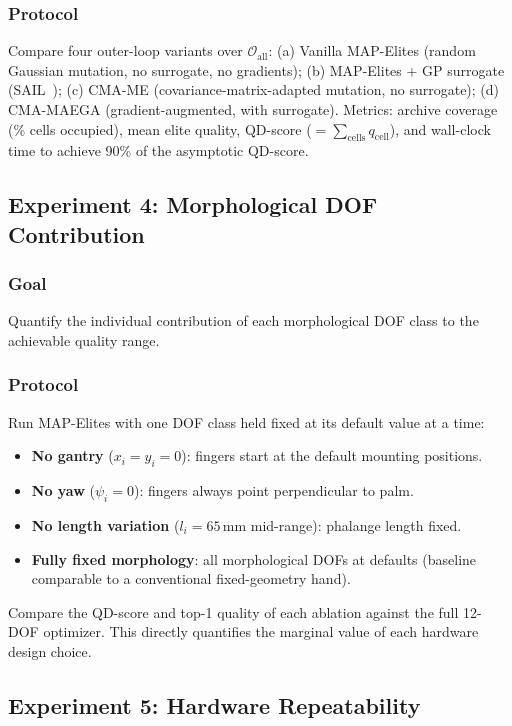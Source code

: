 \documentclass[journal]{IEEEtran}
\newcommand{\cO}{\mathcal{O}}
\begin{document}
\subsubsection{Protocol}
Compare four outer-loop variants over $\cO_{\text{all}}$:
(a) Vanilla MAP-Elites (random Gaussian mutation, no surrogate, no gradients);
(b) MAP-Elites + GP surrogate (SAIL~\cite{gaier2017sail});
(c) CMA-ME (covariance-matrix-adapted mutation, no surrogate);
(d) CMA-MAEGA (gradient-augmented, with surrogate).
Metrics: archive coverage (\% cells occupied), mean elite quality, QD-score
($= \sum_{\text{cells}} q_{\text{cell}}$), and wall-clock time to achieve 90\% of the
asymptotic QD-score.

\subsection{Experiment 4: Morphological DOF Contribution}

\subsubsection{Goal}
Quantify the individual contribution of each morphological DOF class to the achievable
quality range.

\subsubsection{Protocol}
Run MAP-Elites with one DOF class held fixed at its default value at a time:
\begin{itemize}
  \item \textbf{No gantry} ($x_i = y_i = 0$): fingers start at the default mounting positions.
  \item \textbf{No yaw} ($\psi_i = 0$): fingers always point perpendicular to palm.
  \item \textbf{No length variation} ($l_i = 65$\,mm mid-range): phalange length fixed.
  \item \textbf{Fully fixed morphology}: all morphological DOFs at defaults
    (baseline comparable to a conventional fixed-geometry hand).
\end{itemize}
Compare the QD-score and top-1 quality of each ablation against the full 12-DOF optimizer.
This directly quantifies the marginal value of each hardware design choice.

\subsection{Experiment 5: Hardware Repeatability}
\end{document}

